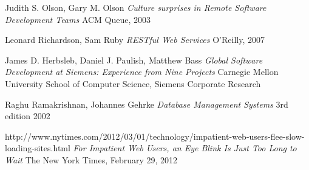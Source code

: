 \begin{thebibliography}{9}

		Judith S. Olson, Gary M. Olson\newline
		\emph{Culture surprises in Remote Software Development Teams}\newline
		ACM Queue, 2003

		Leonard Richardson, Sam Ruby\newline
		\emph{RESTful Web Services}
		O'Reilly, 2007
    
		James D. Herbsleb, Daniel J. Paulish, Matthew Bass\newline
		\emph{Global Software Development at Siemens: Experience from Nine Projects}
		Carnegie Mellon University School of Computer Science,
		Siemens Corporate Research 
	
		Raghu Ramakrishnan, Johannes Gehrke\newline
		\emph{Database Management Systems}\newline
		3rd edition 2002

		http://www.nytimes.com/2012/03/01/technology/impatient-web-users-flee-slow-loading-sites.html\newline
		\emph{For Impatient Web Users, an Eye Blink Is Just Too Long to Wait}\newline
		The New York Times, February 29, 2012

\end{thebibliography}
